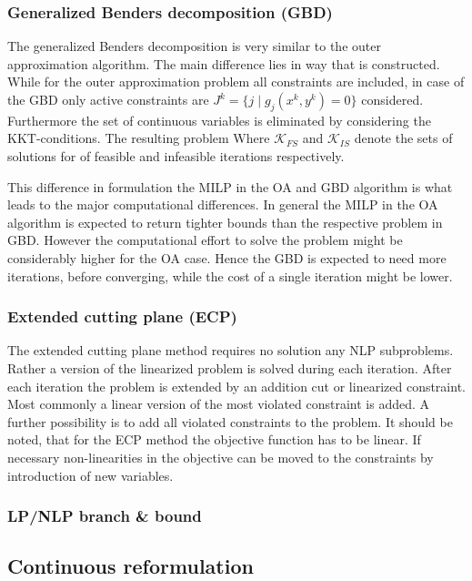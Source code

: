         \subsubsection{Generalized Benders decomposition (GBD)}
        The generalized Benders decomposition is very similar to the outer approximation algorithm. The main difference 
        lies in way that  is constructed. While for the outer approximation problem all constraints 
        are included, in case of the GBD only active constraints are $J^k = \{j \; | \; g_j(x^k,y^k) = 0\}$ considered. 
        Furthermore the set of continuous variables is eliminated by considering the KKT-conditions. The resulting problem 
        Where $\mathcal{K}_{FS}$ and $\mathcal{K}_{IS}$ denote the sets of solutions for of feasible and infeasible
        iterations respectively. 
        
        This difference in formulation the MILP in the OA and GBD algorithm is what leads to the major computational differences. In general the MILP in the OA algorithm is expected to return tighter bounds than the respective 
        problem in GBD. However the computational effort to solve the problem might be considerably higher for the 
        OA case. Hence the GBD is expected to need more iterations, before converging, while the cost of a single 
        iteration might be lower. 
        
        \subsubsection{Extended cutting plane (ECP)}  
        The extended cutting plane method requires no solution any NLP subproblems. Rather a version of the linearized 
        problem is solved during each iteration. After each iteration the problem is extended by an addition cut or 
        linearized constraint. Most commonly a linear version of the most violated constraint is added. A further 
        possibility is to add all violated constraints to the problem. It should be noted, that for the ECP method
        the objective function has to be linear. If necessary non-linearities in the objective can be moved to the constraints by introduction of new variables. 
        
        \subsubsection{LP/NLP branch \& bound}



    \subsection{Continuous reformulation}
